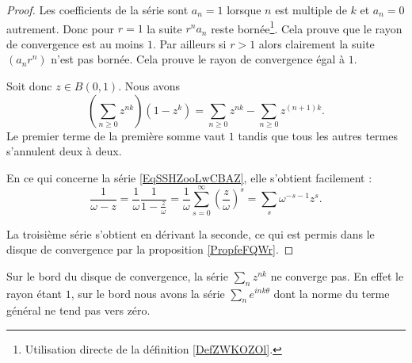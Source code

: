 \begin{proof}
    Les coefficients de la série sont \( a_n=1\) lorsque \( n\) est multiple de \( k\) et \( a_n=0\) autrement. Donc pour \( r=1\) la suite \( r^na_n\) reste bornée\footnote{Utilisation directe de la définition \ref{DefZWKOZOl}.}. Cela prouve que le rayon de convergence est au moins \( 1\). Par ailleurs si \( r>1\) alors clairement la suite \( (a_nr^n)\) n'est pas bornée. Cela prouve le rayon de convergence égal à \( 1\).

    Soit donc \( z\in B(0,1)\). Nous avons
    \begin{equation}
        \left( \sum_{n\geq 0}z^{nk} \right)(1-z^k)=\sum_{n\geq 0}z^{nk}-\sum_{n\geq 0}z^{(n+1)k}.
    \end{equation}
    Le premier terme de la première somme vaut \( 1\) tandis que tous les autres termes s'annulent deux à deux.

    En ce qui concerne la série \eqref{EqSSHZooLwCBAZ}, elle s'obtient facilement :
    \begin{equation}
        \frac{1}{ \omega-z }=\frac{1}{  \omega }\frac{1}{ 1-\frac{ z }{ \omega } }=\frac{1}{ \omega }\sum_{s=0}^{\infty}\left( \frac{ z }{ \omega } \right)^s=\sum_s\omega^{-s-1}z^s.
    \end{equation}
    
    La troisième série s'obtient en dérivant la seconde, ce qui est permis dans le disque de convergence par la proposition \ref{PropfeFQWr}.
\end{proof}

\begin{remark}
    Sur le bord du disque de convergence, la série \( \sum_nz^{nk}\) ne converge pas. En effet le rayon étant \( 1\), sur le bord nous avons la série \( \sum_n e^{ink\theta}\) dont la norme du terme général ne tend pas vers zéro.
\end{remark}

